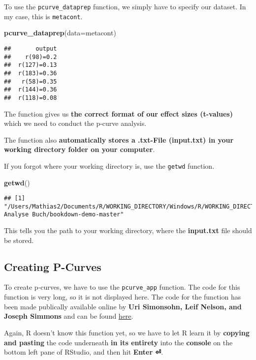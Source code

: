\documentclass[]{book}
\newenvironment{Shaded}{\begin{snugshade}}{\end{snugshade}}
\newcommand{\KeywordTok}[1]{\textcolor[rgb]{0.13,0.29,0.53}{\textbf{#1}}}
\newcommand{\DataTypeTok}[1]{\textcolor[rgb]{0.13,0.29,0.53}{#1}}
\newcommand{\NormalTok}[1]{#1}
\theoremstyle{definition}
\theoremstyle{definition}
\theoremstyle{definition}
\theoremstyle{remark}
\begin{document}
To use the \texttt{pcurve\_dataprep} function, we simply have to specify
our dataset. In my case, this is \texttt{metacont}.

\begin{Shaded}
\begin{Highlighting}[]
\KeywordTok{pcurve_dataprep}\NormalTok{(}\DataTypeTok{data=}\NormalTok{metacont)}
\end{Highlighting}
\end{Shaded}

\begin{verbatim}
##       output
##    r(98)=0.2
##  r(127)=0.13
##  r(183)=0.36
##   r(58)=0.35
##  r(144)=0.36
##  r(118)=0.08
\end{verbatim}

The function gives us \textbf{the correct format of our effect sizes
(t-values)} which we need to conduct the p-curve analysis.

The function also \textbf{automatically stores a .txt-File (input.txt)
in your working directory folder on your computer}.

If you forgot where your working directory is, use the \texttt{getwd}
function.

\begin{Shaded}
\begin{Highlighting}[]
\KeywordTok{getwd}\NormalTok{()}
\end{Highlighting}
\end{Shaded}

\begin{verbatim}
## [1] "/Users/Mathias2/Documents/R/WORKING_DIRECTORY/Windows/R/WORKING_DIRECTORY/Meta-Analyse Buch/bookdown-demo-master"
\end{verbatim}

This tells you the path to your working directory, where the
\textbf{input.txt} file should be stored.

\subsection{Creating P-Curves}\label{creating-p-curves}

To create p-curves, we have to use the \texttt{pcurve\_app} function.
The code for this function is very long, so it is not displayed here.
The code for the function has been made publically available online by
\textbf{Uri Simonsohn, Leif Nelson, and Joseph Simmons} and can be found
\href{http://p-curve.com/app4/pcurve_app4.06.r}{here}.

Again, R doesn't know this function yet, so we have to let R learn it by
\textbf{copying and pasting} the code underneath \textbf{in its
entirety} into the \textbf{console} on the bottom left pane of RStudio,
and then hit \textbf{Enter ⏎}.
\end{document}
